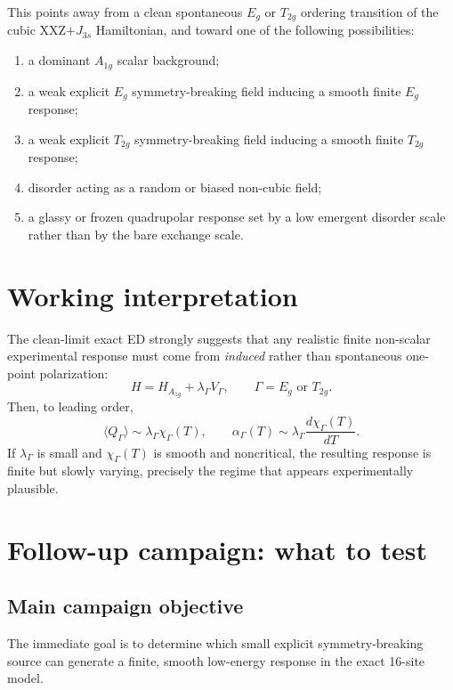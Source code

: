 \documentclass[11pt]{article}
\begin{document}
This points away from a clean spontaneous $E_g$ or $T_{2g}$ ordering transition
of the cubic XXZ$+J_{3s}$ Hamiltonian, and toward one of the following
possibilities:
\begin{enumerate}[leftmargin=1.8em]
\item a dominant $A_{1g}$ scalar background;
\item a weak explicit $E_g$ symmetry-breaking field inducing a smooth finite
$E_g$ response;
\item a weak explicit $T_{2g}$ symmetry-breaking field inducing a smooth finite
$T_{2g}$ response;
\item disorder acting as a random or biased non-cubic field;
\item a glassy or frozen quadrupolar response set by a low emergent disorder
scale rather than by the bare exchange scale.
\end{enumerate}

\section{Working interpretation}

The clean-limit exact ED strongly suggests that any realistic finite non-scalar
experimental response must come from \emph{induced} rather than spontaneous
one-point polarization:
\begin{equation}
H = H_{A_{1g}} + \lambda_\Gamma V_\Gamma,
\qquad
\Gamma = E_g \text{ or } T_{2g}.
\end{equation}
Then, to leading order,
\begin{equation}
\langle Q_\Gamma \rangle \sim \lambda_\Gamma \chi_\Gamma(T),
\qquad
\alpha_\Gamma(T) \sim \lambda_\Gamma \frac{d\chi_\Gamma(T)}{dT}.
\end{equation}
If $\lambda_\Gamma$ is small and $\chi_\Gamma(T)$ is smooth and noncritical,
the resulting response is finite but slowly varying, precisely the regime that
appears experimentally plausible.

\section{Follow-up campaign: what to test}

\subsection{Main campaign objective}

The immediate goal is to determine which small explicit symmetry-breaking source
can generate a finite, smooth low-energy response in the exact 16-site model.
\end{document}
